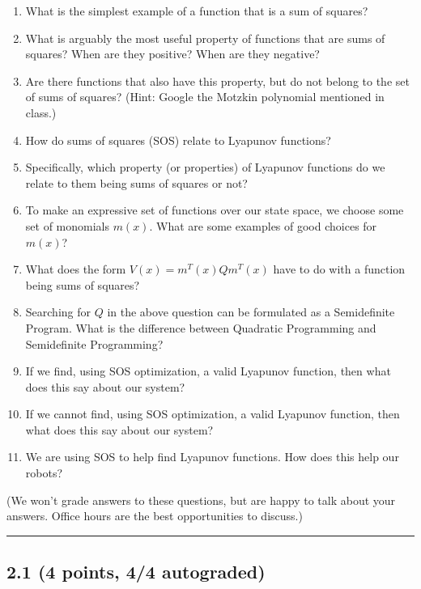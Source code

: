 \documentclass[11pt]{article}
\begin{document}
\begin{enumerate}
\def\labelenumi{\arabic{enumi}.}
\item
  What is the simplest example of a function that is a sum of squares?
\item
  What is arguably the most useful property of functions that are sums
  of squares? When are they positive? When are they negative?
\item
  Are there functions that also have this property, but do not belong to
  the set of sums of squares? (Hint: Google the Motzkin polynomial
  mentioned in class.)
\item
  How do sums of squares (SOS) relate to Lyapunov functions?
\item
  Specifically, which property (or properties) of Lyapunov functions do
  we relate to them being sums of squares or not?
\item
  To make an expressive set of functions over our state space, we choose
  some set of monomials \(m(x)\). What are some examples of good choices
  for \(m(x)\)?
\item
  What does the form \(V(x) = m^T(x) Q m^T(x)\) have to do with a
  function being sums of squares?
\item
  Searching for \(Q\) in the above question can be formulated as a
  Semidefinite Program. What is the difference between Quadratic
  Programming and Semidefinite Programming?
\item
  If we find, using SOS optimization, a valid Lyapunov function, then
  what does this say about our system?
\item
  If we cannot find, using SOS optimization, a valid Lyapunov function,
  then what does this say about our system?
\item
  We are using SOS to help find Lyapunov functions. How does this help
  our robots?
\end{enumerate}

(We won't grade answers to these questions, but are happy to talk about
your answers. Office hours are the best opportunities to discuss.)

\begin{center}\rule{0.5\linewidth}{\linethickness}\end{center}

    \subsection{2.1 (4 points, 4/4 autograded)}\label{points-44-autograded}
\end{document}
